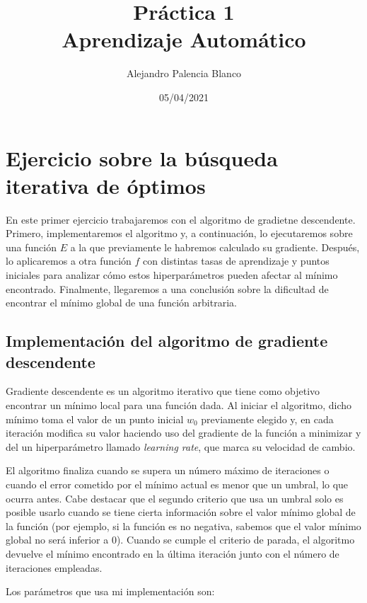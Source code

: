 \documentclass[10pt,a4paper]{article}
\title{
Práctica 1\\
\large Aprendizaje Automático \\
}
\author{
Alejandro Palencia Blanco\\
}
\date{05/04/2021}
\begin{document}
\maketitle

\newpage

\tableofcontents

\newpage

\section{Ejercicio sobre la búsqueda iterativa de óptimos}

En este primer ejercicio trabajaremos con el algoritmo de gradietne descendente. Primero, implementaremos el algoritmo y, a continuación, lo ejecutaremos sobre una función $E$ a la que previamente le habremos calculado su gradiente. Después, lo aplicaremos a otra función $f$ con distintas tasas de aprendizaje y puntos iniciales para analizar cómo estos hiperparámetros pueden afectar al mínimo encontrado. Finalmente, llegaremos a una conclusión sobre la dificultad de encontrar el mínimo global de una función arbitraria.



\subsection{Implementación del algoritmo de gradiente descendente}

Gradiente descendente es un algoritmo iterativo que tiene como objetivo encontrar un mínimo local para una función dada. Al iniciar el algoritmo, dicho mínimo toma el valor de un punto inicial $w_0$ previamente elegido y, en cada iteración modifica su valor haciendo uso del gradiente de la función a minimizar y del un hiperparámetro llamado \textit{learning rate}, que marca su velocidad de cambio.

El algoritmo finaliza cuando se supera un número máximo de iteraciones o cuando el error cometido por el mínimo actual es menor que un umbral, lo que ocurra antes. Cabe destacar que el segundo criterio que usa un umbral solo es posible usarlo cuando se tiene cierta información sobre el valor mínimo global de la función (por ejemplo, si la función es no negativa, sabemos que el valor mínimo global no será inferior a 0). Cuando se cumple el criterio de parada, el algoritmo devuelve el mínimo encontrado en la última iteración junto con el número de iteraciones empleadas.

Los parámetros que usa mi implementación son:
\end{document}
